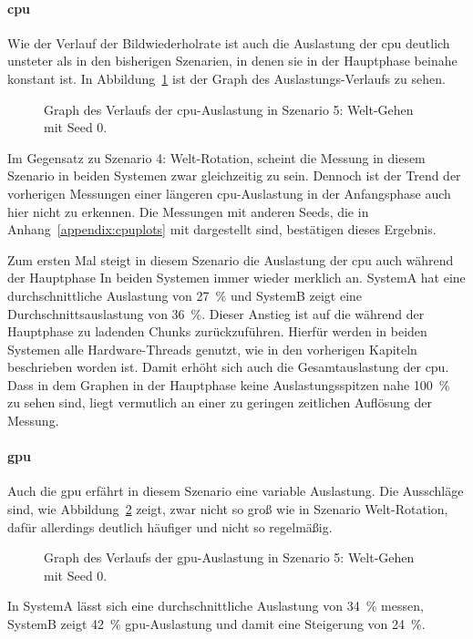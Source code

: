 \paragraph{\ac{cpu}}
Wie der Verlauf der Bildwiederholrate ist auch die Auslastung der \ac{cpu} deutlich unsteter als in den bisherigen Szenarien, in denen sie in der Hauptphase beinahe konstant ist. In Abbildung~\ref{fig:seed-0-walk-cpu} ist der Graph des Auslastungs-Verlaufs zu sehen.
\begin{figure}[!htbp]
	\caption[Graph des Verlaufs der -Auslastung in Szenario 5: Welt-Gehen mit Seed 0.]{Graph des Verlaufs der \ac{cpu}-Auslastung in Szenario 5: Welt-Gehen mit Seed 0.}\label{fig:seed-0-walk-cpu}
\end{figure}
Im Gegensatz zu Szenario 4: Welt-Rotation, scheint die Messung in diesem Szenario in beiden Systemen zwar gleichzeitig zu sein. Dennoch ist der Trend der vorherigen Messungen einer längeren \ac{cpu}-Auslastung in der Anfangsphase auch hier nicht zu erkennen. Die Messungen mit anderen Seeds, die in Anhang~\vref{appendix:cpuplots} mit dargestellt sind, bestätigen dieses Ergebnis.

Zum ersten Mal steigt in diesem Szenario die Auslastung der \ac{cpu} auch während der Hauptphase In beiden Systemen immer wieder merklich an. SystemA hat eine durchschnittliche Auslastung von \SI{27}{\percent} und SystemB zeigt eine Durchschnittsauslastung von \SI{36}{\percent}. Dieser Anstieg ist auf die während der Hauptphase zu ladenden Chunks zurückzuführen. Hierfür werden in beiden Systemen alle Hardware-Threads genutzt, wie in den vorherigen Kapiteln beschrieben worden ist. Damit erhöht sich auch die Gesamtauslastung der \ac{cpu}. Dass in dem Graphen in der Hauptphase keine Auslastungsspitzen nahe \SI{100}{\percent} zu sehen sind, liegt vermutlich an einer zu geringen zeitlichen Auflösung der Messung.

\paragraph{\ac{gpu}}
Auch die \ac{gpu} erfährt in diesem Szenario eine variable Auslastung. Die Ausschläge sind, wie Abbildung~\ref{fig:seed-0-walk-gpu} zeigt, zwar nicht so groß wie in Szenario Welt-Rotation, dafür allerdings deutlich häufiger und nicht so regelmäßig.
\begin{figure}[!htbp]
	\caption[Graph des Verlaufs der -Auslastung in Szenario 5: Welt-Gehen mit Seed 0.]{Graph des Verlaufs der \ac{gpu}-Auslastung in Szenario 5: Welt-Gehen mit Seed 0.}\label{fig:seed-0-walk-gpu}
\end{figure}
In SystemA lässt sich eine durchschnittliche Auslastung von \SI{34}{\percent} messen, SystemB zeigt \SI{42}{\percent} \ac{gpu}-Auslastung und damit eine Steigerung von \SI{24}{\percent}.

